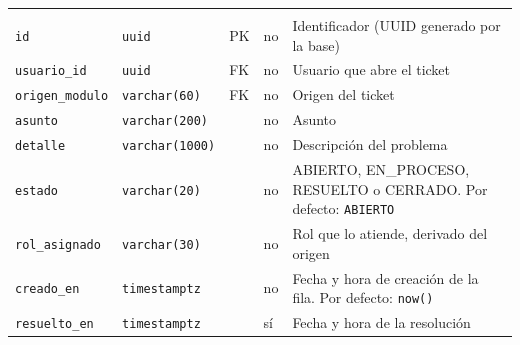 {\small
\begin{xltabular}{\textwidth}{@{}>{\raggedright\arraybackslash}p{3.6cm} >{\raggedright\arraybackslash}p{2.3cm} >{\raggedright\arraybackslash}p{1cm} >{\centering\arraybackslash}p{0.85cm} L@{}}
    \toprule
     &  &  &  &  \\
    \midrule
    \endfirsthead
    \toprule
     &  &  &  &  \\
    \midrule
    \endhead
    \bottomrule
    \endfoot
    \texttt{id} & \texttt{uuid} & PK & no & Identificador (UUID generado por la base) \\
    \texttt{usuario\_\allowbreak{}id} & \texttt{uuid} & FK & no & Usuario que abre el ticket \\
    \texttt{origen\_\allowbreak{}modulo} & \texttt{varchar(\allowbreak{}60)} & FK & no & Origen del ticket \\
    \texttt{asunto} & \texttt{varchar(\allowbreak{}200)} &  & no & Asunto \\
    \texttt{detalle} & \texttt{varchar(\allowbreak{}1000)} &  & no & Descripción del problema \\
    \texttt{estado} & \texttt{varchar(\allowbreak{}20)} &  & no & ABIERTO, EN\_PROCESO, RESUELTO o CERRADO. Por defecto: \texttt{\textquotesingle{}ABIERTO\textquotesingle{}} \\
    \texttt{rol\_\allowbreak{}asignado} & \texttt{varchar(\allowbreak{}30)} &  & no & Rol que lo atiende, derivado del origen \\
    \texttt{creado\_\allowbreak{}en} & \texttt{timestamptz} &  & no & Fecha y hora de creación de la fila. Por defecto: \texttt{now(\allowbreak{})} \\
    \texttt{resuelto\_\allowbreak{}en} & \texttt{timestamptz} &  & sí & Fecha y hora de la resolución \\
\end{xltabular}
}

